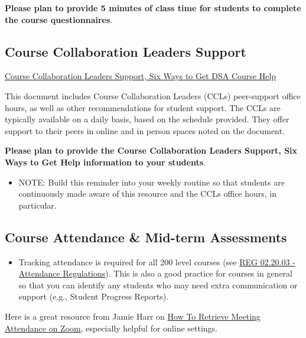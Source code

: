 \documentclass[
]{book}
\providecommand{\tightlist}{%
  \setlength{\itemsep}{0pt}\setlength{\parskip}{0pt}}
\begin{document}
{ \textbf{Please plan to provide 5 minutes of class time for students to complete the course questionnaires}. }

\hypertarget{course-collaboration-leaders-support}{%
\subsection{Course Collaboration Leaders Support}\label{course-collaboration-leaders-support}}

\href{https://docs.google.com/document/d/1ZNli1SdLy-AdxarjaNLSRpQOmh9q9KsAvqzWCcb_Wrg/edit?usp=sharing}{Course Collaboration Leaders Support, Six Ways to Get DSA Course Help}

This document includes Course Collaboration Leaders (CCLs) peer-support office hours, as well as other recommendations for student support. The CCLs are typically available on a daily basis, based on the schedule provided. They offer support to their peers in online and in person spaces noted on the document.

{ \textbf{Please plan to provide the Course Collaboration Leaders Support, Six Ways to Get Help information to your students}. }

\begin{itemize}
\tightlist
\item
  NOTE: Build this reminder into your weekly routine so that students are continuously made aware of this resource and the CCLs office hours, in particular.
\end{itemize}

\hypertarget{course-attendance-mid-term-assessments}{%
\subsection{Course Attendance \& Mid-term Assessments}\label{course-attendance-mid-term-assessments}}

\begin{itemize}
\tightlist
\item
  Tracking attendance is required for all 200 level courses (see \href{https://policies.ncsu.edu/regulation/reg-02-20-03-attendance-regulations/}{REG 02.20.03 - Attendance Regulations}). This is also a good practice for courses in general so that you can identify any students who may need extra communication or support (e.g., Student Progress Reports).
\end{itemize}

Here is a great resource from Jamie Harr on \href{https://drive.google.com/file/d/19vuYwyGcMrrBjQVzWbaDph1aHUR7u2bu/view?usp=drive_link}{How To Retrieve Meeting Attendance on Zoom}, especially helpful for online settings.
\end{document}
